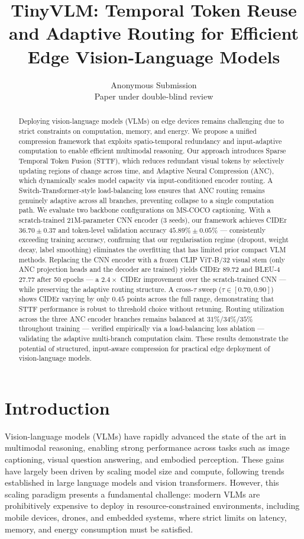 \documentclass{article}
\title{TinyVLM: Temporal Token Reuse and Adaptive Routing for Efficient Edge Vision-Language Models}
\author{%
  Anonymous Submission \\
  Paper under double-blind review \\
}
\begin{document}
\maketitle


\begin{abstract}
Deploying vision-language models (VLMs) on edge devices remains challenging due to strict constraints on computation, memory, and energy. We propose a unified compression framework that exploits spatio-temporal redundancy and input-adaptive computation to enable efficient multimodal reasoning. Our approach introduces Sparse Temporal Token Fusion (STTF), which reduces redundant visual tokens by selectively updating regions of change across time, and Adaptive Neural Compression (ANC), which dynamically scales model capacity via input-conditioned encoder routing. A Switch-Transformer-style load-balancing loss ensures that ANC routing remains genuinely adaptive across all branches, preventing collapse to a single computation path. We evaluate two backbone configurations on MS-COCO captioning. With a scratch-trained 21M-parameter CNN encoder (3 seeds), our framework achieves CIDEr $36.70 \pm 0.37$ and token-level validation accuracy $45.89\% \pm 0.05\%$ — consistently exceeding training accuracy, confirming that our regularisation regime (dropout, weight decay, label smoothing) eliminates the overfitting that has limited prior compact VLM methods. Replacing the CNN encoder with a frozen CLIP ViT-B/32 visual stem (only ANC projection heads and the decoder are trained) yields CIDEr $89.72$ and BLEU-4 $27.77$ after 50 epochs — a $2.4\times$ CIDEr improvement over the scratch-trained CNN — while preserving the adaptive routing structure. A cross-$\tau$ sweep ($\tau \in [0.70, 0.90]$) shows CIDEr varying by only $0.45$ points across the full range, demonstrating that STTF performance is robust to threshold choice without retuning. Routing utilization across the three ANC encoder branches remains balanced at $31\%$/$34\%$/$35\%$ throughout training — verified empirically via a load-balancing loss ablation — validating the adaptive multi-branch computation claim. These results demonstrate the potential of structured, input-aware compression for practical edge deployment of vision-language models.

\end{abstract}



\section{Introduction}
Vision-language models (VLMs) have rapidly advanced the state of the art in multimodal reasoning, enabling strong performance across tasks such as image captioning, visual question answering, and embodied perception. These gains have largely been driven by scaling model size and compute, following trends established in large language models and vision transformers. However, this scaling paradigm presents a fundamental challenge: modern VLMs are prohibitively expensive to deploy in resource-constrained environments, including mobile devices, drones, and embedded systems, where strict limits on latency, memory, and energy consumption must be satisfied.
\end{document}
